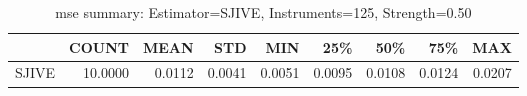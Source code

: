\begin{table}[ht]
\centering
\caption{mse summary: Estimator=SJIVE, Instruments=125, Strength=0.50}
\begin{tabular}{lrrrrrrrr}
\toprule
 & COUNT & MEAN & STD & MIN & 25\% & 50\% & 75\% & MAX \\
\midrule
SJIVE & 10.0000 & 0.0112 & 0.0041 & 0.0051 & 0.0095 & 0.0108 & 0.0124 & 0.0207 \\
\bottomrule
\end{tabular}
\end{table}
